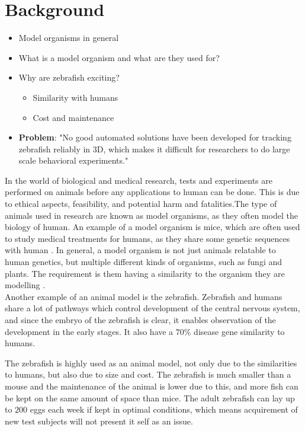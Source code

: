 \graphicspath{{figures/intro/}}
\chapter{Background}\label{ch:intro}

\begin{itemize}
	\item Model organisms in general
	\item What is a model organism and what are they used for?
	\item Why are zebrafish exciting?
	\begin{itemize}
		\item Similarity with humans
		\item Cost and maintenance
	\end{itemize}
	\item \textbf{Problem}: "No good automated solutions have been developed for tracking zebrafish reliably in 3D, which makes it difficult for researchers to do large scale behavioral experiments." 
\end{itemize}

In the world of biological and medical research, tests and experiments are performed on animals before any applications to human can be done. This is due to ethical aspects, feasibility, and potential harm and fatalities.The type of animals used in research are known as model organisms, as they often model the biology of human. An example of a model organism is mice, which are often used to study medical treatments for humans, as they share some genetic sequences with human \citep{Perlman2016, RahmanKhan2018}. 
In general, a model organism is not just animals relatable to human genetics, but multiple different kinds of organisms, such as fungi and plants. The requirement is them having a similarity to the organism they are modelling \citep{Hedges2002}.\\

Another example of an animal model is the zebrafish. Zebrafish and humans share a lot of pathways which control development of the central nervous system, and since the embryo of the zebrafish is clear, it enables observation of the development in the early stages. It also have a $70\%$ disease gene similarity to humans. 

The zebrafish is highly used as an animal model, not only due to the similarities to humans, but also due to size and cost. The zebrafish is much smaller than a mouse and the maintenance of the animal is lower due to this, and more fish can be kept on the same amount of space than mice.
The adult zebrafish can lay up to $200$ eggs each week if kept in optimal conditions, which means acquirement of new test subjects will not present it self as an issue.


